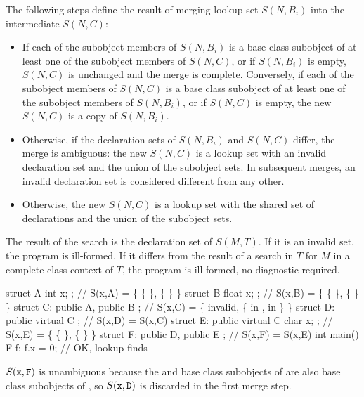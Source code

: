 \pnum
The following steps define the result of merging lookup set $S(N,B_i)$
into the intermediate $S(N,C)$:

\begin{itemize}
\item If each of the subobject members of $S(N,B_i)$ is a base class
subobject of at least one of the subobject members of $S(N,C)$, or if
$S(N,B_i)$ is empty, $S(N,C)$ is unchanged and the merge is complete.
Conversely, if each of the subobject members of $S(N,C)$ is a base class
subobject of at least one of the subobject members of $S(N,B_i)$, or if
$S(N,C)$ is empty, the new $S(N,C)$ is a copy of $S(N,B_i)$.

\item Otherwise, if the declaration sets of $S(N,B_i)$ and $S(N,C)$
differ, the merge is ambiguous: the new $S(N,C)$ is a lookup set with an
invalid declaration set and the union of the subobject sets. In
subsequent merges, an invalid declaration set is considered different
from any other.

\item Otherwise, the new $S(N,C)$ is a lookup set with the shared set of
declarations and the union of the subobject sets.
\end{itemize}

\pnum
The result of the search is the declaration set of $S(M,T)$.
If it is an invalid set, the program is ill-formed.
If it differs from the result of a search in $T$ for $M$
in a complete-class context of $T$,
the program is ill-formed, no diagnostic required.
\begin{example}
\begin{codeblock}
struct A { int x; };                    // S(x,A) = \{ \{  \}, \{  \} \}
struct B { float x; };                  // S(x,B) = \{ \{  \}, \{  \} \}
struct C: public A, public B { };       // S(x,C) = \{ invalid, \{  in ,  in  \} \}
struct D: public virtual C { };         // S(x,D) = S(x,C)
struct E: public virtual C { char x; }; // S(x,E) = \{ \{  \}, \{  \} \}
struct F: public D, public E { };       // S(x,F) = S(x,E)
int main() {
  F f;
  f.x = 0;                              // OK, lookup finds 
}
\end{codeblock}

$S(\tcode{x},\tcode{F})$ is unambiguous because the  and  base
class subobjects of  are also base class subobjects of , so
$S(\tcode{x},\tcode{D})$ is discarded in the first merge step.
\end{example}

